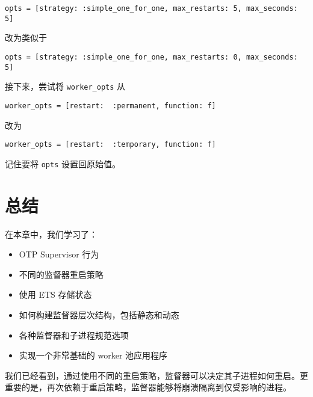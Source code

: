 \begin{code}{}
\begin{verbatim}
opts = [strategy: :simple_one_for_one, max_restarts: 5, max_seconds: 5]
\end{verbatim}
\end{code}

改为类似于

\begin{code}{}
\begin{verbatim}
opts = [strategy: :simple_one_for_one, max_restarts: 0, max_seconds: 5]
\end{verbatim}
\end{code}

接下来，尝试将 \texttt{worker\_opts} 从

\begin{code}{}
\begin{verbatim}
worker_opts = [restart:  :permanent, function: f]
\end{verbatim}
\end{code}

改为

\begin{code}{}
\begin{verbatim}
worker_opts = [restart:  :temporary, function: f]
\end{verbatim}
\end{code}

记住要将 \texttt{opts} 设置回原始值。

 \section{总结}

在本章中，我们学习了：

\begin{itemize}

\item
  OTP Supervisor 行为
\item
  不同的监督器重启策略
\item
  使用 ETS 存储状态
\item
  如何构建监督器层次结构，包括静态和动态
\item
  各种监督器和子进程规范选项
\item
  实现一个非常基础的 worker 池应用程序
\end{itemize}

我们已经看到，通过使用不同的重启策略，监督器可以决定其子进程如何重启。更重要的是，再次依赖于重启策略，监督器能够将崩溃隔离到仅受影响的进程。

